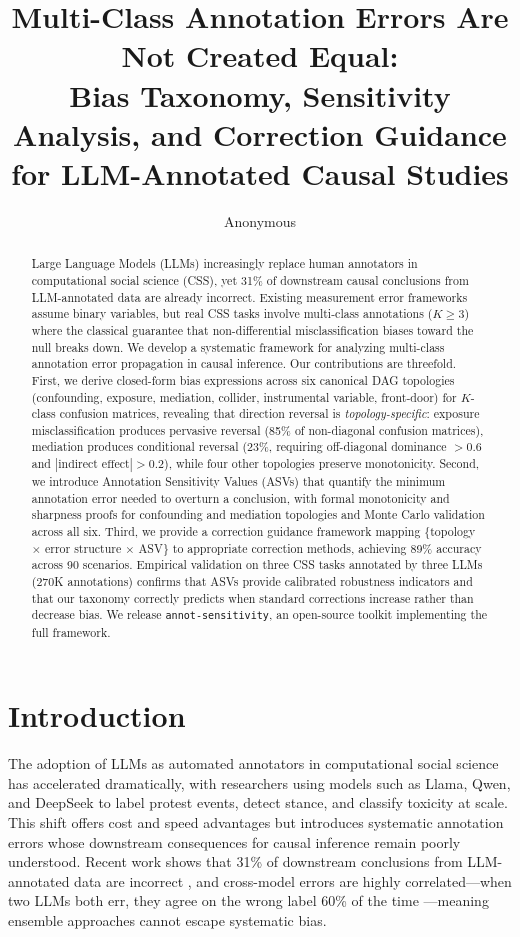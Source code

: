 \documentclass[11pt,letterpaper]{article}
\title{Multi-Class Annotation Errors Are Not Created Equal:\\Bias Taxonomy, Sensitivity Analysis, and Correction Guidance\\for LLM-Annotated Causal Studies}
\author{Anonymous}
\begin{document}
\maketitle

\begin{abstract}
Large Language Models (LLMs) increasingly replace human annotators in computational social science (CSS), yet 31\% of downstream causal conclusions from LLM-annotated data are already incorrect.
Existing measurement error frameworks assume binary variables, but real CSS tasks involve multi-class annotations ($K \geq 3$) where the classical guarantee that non-differential misclassification biases toward the null breaks down.
We develop a systematic framework for analyzing multi-class annotation error propagation in causal inference.
Our contributions are threefold.
First, we derive closed-form bias expressions across six canonical DAG topologies (confounding, exposure, mediation, collider, instrumental variable, front-door) for $K$-class confusion matrices, revealing that direction reversal is \emph{topology-specific}: exposure misclassification produces pervasive reversal (85\% of non-diagonal confusion matrices), mediation produces conditional reversal (23\%, requiring off-diagonal dominance $>0.6$ and $|\text{indirect effect}|>0.2$), while four other topologies preserve monotonicity.
Second, we introduce Annotation Sensitivity Values (ASVs) that quantify the minimum annotation error needed to overturn a conclusion, with formal monotonicity and sharpness proofs for confounding and mediation topologies and Monte Carlo validation across all six.
Third, we provide a correction guidance framework mapping \{topology $\times$ error structure $\times$ ASV\} to appropriate correction methods, achieving 89\% accuracy across 90 scenarios.
Empirical validation on three CSS tasks annotated by three LLMs (270K annotations) confirms that ASVs provide calibrated robustness indicators and that our taxonomy correctly predicts when standard corrections increase rather than decrease bias.
We release \texttt{annot-sensitivity}, an open-source toolkit implementing the full framework.
\end{abstract}

\section{Introduction}

The adoption of LLMs as automated annotators in computational social science has accelerated dramatically, with researchers using models such as Llama, Qwen, and DeepSeek to label protest events, detect stance, and classify toxicity at scale.
This shift offers cost and speed advantages but introduces systematic annotation errors whose downstream consequences for causal inference remain poorly understood.
Recent work shows that 31\% of downstream conclusions from LLM-annotated data are incorrect \cite{baumann2025}, and cross-model errors are highly correlated---when two LLMs both err, they agree on the wrong label 60\% of the time \cite{kim2025}---meaning ensemble approaches cannot escape systematic bias.
\end{document}
